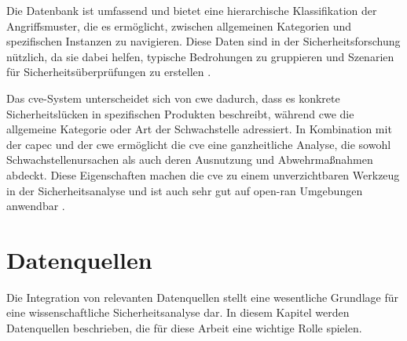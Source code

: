 Die Datenbank ist umfassend und bietet eine hierarchische Klassifikation der Angriffsmuster, die es ermöglicht, zwischen allgemeinen Kategorien und spezifischen Instanzen zu navigieren. Diese Daten sind in der Sicherheitsforschung nützlich, da sie dabei helfen, typische Bedrohungen zu gruppieren und Szenarien für Sicherheitsüberprüfungen zu erstellen \autocite{CAPECWebsite}.

\par Das \gls{cve}-System unterscheidet sich von \gls{cwe} dadurch, dass es konkrete Sicherheitslücken in spezifischen Produkten beschreibt, während \gls{cwe} die allgemeine Kategorie oder Art der Schwachstelle adressiert. In Kombination mit der \gls{capec} und der \gls{cwe} ermöglicht die \gls{cve} eine ganzheitliche Analyse, die sowohl Schwachstellenursachen als auch deren Ausnutzung und Abwehrmaßnahmen abdeckt. Diese Eigenschaften machen die \gls{cve} zu einem unverzichtbaren Werkzeug in der Sicherheitsanalyse und ist auch sehr gut auf \gls{open-ran} Umgebungen anwendbar \cite{CVEWebsite}.

\section{Datenquellen}
\label{sec:datenquellen}
Die Integration von relevanten Datenquellen stellt eine wesentliche Grundlage für eine wissenschaftliche Sicherheitsanalyse dar. In diesem Kapitel werden Datenquellen beschrieben, die für diese Arbeit eine wichtige Rolle spielen.
